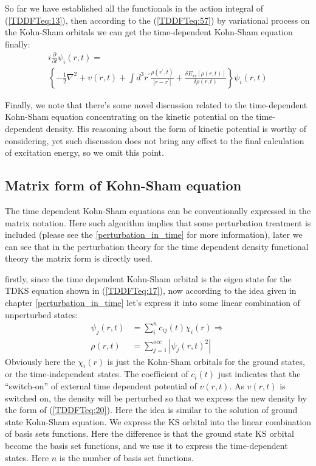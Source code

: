 So far we have established all the functionals in the action
integral of (\ref{TDDFTeq:13}), then according to the
(\ref{TDDFTeq:57}) by variational process on the Kohn-Sham orbitals
we can get the time-dependent Kohn-Sham equation finally:
\begin{multline}\label{TDDFTeq:17}
i\frac{\partial}{\partial t}\psi_{i}(r,t) = \\
\left\{ -\frac{1}{2}\nabla^{2} + v(r,t) + \int
d^{3}r^{'}\frac{\rho(r^{'}, t)}{|r-r^{'}|} + \frac{\delta
E_{xc}[\rho(r,t)]}{\delta\rho(r,t)} \right\}\psi_{i}(r,t)
\end{multline}

Finally, we note that there's some novel discussion related to the
time-dependent Kohn-Sham equation concentrating on the kinetic
potential on the time-dependent density\cite{furche:5982}. His
reasoning about the form of kinetic potential is worthy of
considering, yet such discussion does not bring any effect to the
final calculation of excitation energy, so we omit this point.

\subsection{Matrix form of Kohn-Sham equation}\label{TDKS_equation}
%
%
The time dependent Kohn-Sham equations can be conventionally expressed
in the matrix notation. Here such algorithm implies that some
perturbation treatment is included (please see the
\ref{perturbation_in_time} for more information), later we can see
that in the perturbation theory for the time dependent density
functional theory the matrix form is directly used.

firstly, since the time dependent Kohn-Sham orbital is the eigen state
for the TDKS equation shown in (\ref{TDDFTeq:17}), now according to
the idea given in chapter \ref{perturbation_in_time} let's express it
into some linear combination of unperturbed states:
\begin{align}\label{TDDFTeq:20}
\psi_{j}(r,t) &= \sum_{i}^{n}c_{ij}(t)\chi_{i}(r) \Rightarrow
\nonumber \\
\rho(r,t) &= \sum_{j=1}^{occ}|\psi_{j}(r,t)^{2}| 
\end{align}
Obviously here the $\chi_{i}(r)$ is just the Kohn-Sham orbitals for
the ground states, or the time-independent states. The coefficient of
$c_{i}(t)$ just indicates that the ``switch-on'' of external time
dependent potential of $v(r,t)$. As $v(r,t)$ is switched on, the
density will be perturbed so that we express the new density by the
form of (\ref{TDDFTeq:20}). Here the idea is similar to the solution
of ground state Kohn-Sham equation. We express the KS orbital into the
linear combination of basis sets functions. Here the difference is
that the ground state KS orbital become the basis set functions, and
we use it to express the time-dependent states. Here $n$ is the number
of basis set functions.

